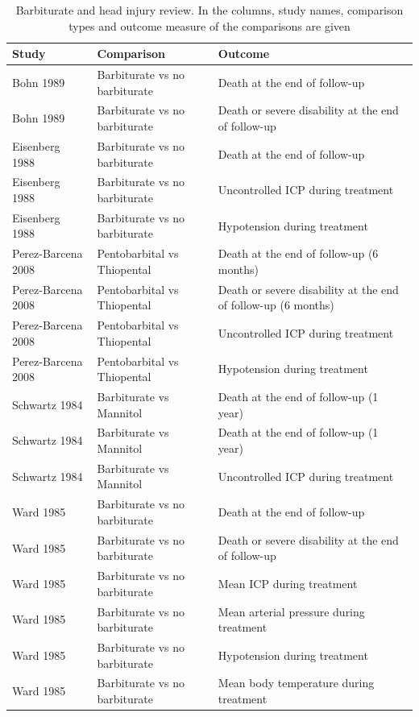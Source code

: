 \documentclass[11pt,a4paper,twoside]{book}\usepackage[]{graphicx}\usepackage[]{color}
\begin{document}
\begin{table}[ht]
\centering
\begingroup\footnotesize
\begin{tabular}{lll}
  \hline
Study & Comparison & Outcome \\ 
  \hline
Bohn 1989 & Barbiturate vs no barbiturate & Death at the end of follow-up \\ 
  Bohn 1989 & Barbiturate vs no barbiturate & Death or severe disability at the end of follow-up \\ 
  Eisenberg 1988 & Barbiturate vs no barbiturate & Death at the end of follow-up \\ 
  Eisenberg 1988 & Barbiturate vs no barbiturate & Uncontrolled ICP during treatment \\ 
  Eisenberg 1988 & Barbiturate vs no barbiturate & Hypotension during treatment \\ 
  Perez-Barcena 2008 & Pentobarbital vs Thiopental & Death at the end of follow-up (6 months) \\ 
  Perez-Barcena 2008 & Pentobarbital vs Thiopental & Death or severe disability at the end of follow-up (6 months) \\ 
  Perez-Barcena 2008 & Pentobarbital vs Thiopental & Uncontrolled ICP during treatment \\ 
  Perez-Barcena 2008 & Pentobarbital vs Thiopental & Hypotension during treatment \\ 
  Schwartz 1984 & Barbiturate vs Mannitol & Death at the end of follow-up (1 year) \\ 
  Schwartz 1984 & Barbiturate vs Mannitol & Death at the end of follow-up (1 year) \\ 
  Schwartz 1984 & Barbiturate vs Mannitol & Uncontrolled ICP during treatment \\ 
  Ward 1985 & Barbiturate vs no barbiturate & Death at the end of follow-up \\ 
  Ward 1985 & Barbiturate vs no barbiturate & Death or severe disability at the end of follow-up \\ 
  Ward 1985 & Barbiturate vs no barbiturate & Mean ICP during treatment \\ 
  Ward 1985 & Barbiturate vs no barbiturate & Mean arterial pressure during treatment \\ 
  Ward 1985 & Barbiturate vs no barbiturate & Hypotension during treatment \\ 
  Ward 1985 & Barbiturate vs no barbiturate & Mean body temperature during treatment \\ 
   \hline
\end{tabular}
\endgroup
\caption{Barbiturate and head injury review. In the columns, study names, comparison types and outcome measure of the comparisons are given} 
\label{barbiturates}
\end{table}
\end{document}
